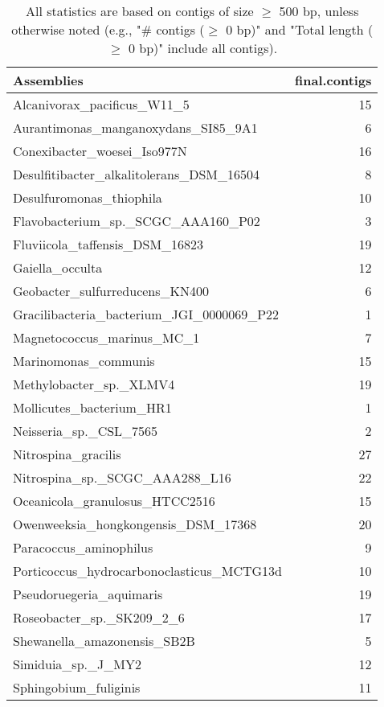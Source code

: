 \documentclass[12pt,a4paper]{article}
\begin{document}
\begin{table}[ht]
\begin{center}
\caption{All statistics are based on contigs of size $\geq$ 500 bp, unless otherwise noted (e.g., "\# contigs ($\geq$ 0 bp)" and "Total length ($\geq$ 0 bp)" include all contigs).}
\begin{tabular}{|l*{1}{|r}|}
\hline
Assemblies & final.contigs \\ \hline
Alcanivorax\_pacificus\_W11\_5 & 15 \\ \hline
Aurantimonas\_manganoxydans\_SI85\_9A1 & 6 \\ \hline
Conexibacter\_woesei\_Iso977N & 16 \\ \hline
Desulfitibacter\_alkalitolerans\_DSM\_16504 & 8 \\ \hline
Desulfuromonas\_thiophila & 10 \\ \hline
Flavobacterium\_sp.\_SCGC\_AAA160\_P02 & 3 \\ \hline
Fluviicola\_taffensis\_DSM\_16823 & 19 \\ \hline
Gaiella\_occulta & 12 \\ \hline
Geobacter\_sulfurreducens\_KN400 & 6 \\ \hline
Gracilibacteria\_bacterium\_JGI\_0000069\_P22 & 1 \\ \hline
Magnetococcus\_marinus\_MC\_1 & 7 \\ \hline
Marinomonas\_communis & 15 \\ \hline
Methylobacter\_sp.\_XLMV4 & 19 \\ \hline
Mollicutes\_bacterium\_HR1 & 1 \\ \hline
Neisseria\_sp.\_CSL\_7565 & 2 \\ \hline
Nitrospina\_gracilis & 27 \\ \hline
Nitrospina\_sp.\_SCGC\_AAA288\_L16 & 22 \\ \hline
Oceanicola\_granulosus\_HTCC2516 & 15 \\ \hline
Owenweeksia\_hongkongensis\_DSM\_17368 & 20 \\ \hline
Paracoccus\_aminophilus & 9 \\ \hline
Porticoccus\_hydrocarbonoclasticus\_MCTG13d & 10 \\ \hline
Pseudoruegeria\_aquimaris & 19 \\ \hline
Roseobacter\_sp.\_SK209\_2\_6 & 17 \\ \hline
Shewanella\_amazonensis\_SB2B & 5 \\ \hline
Simiduia\_sp.\_J\_MY2 & 12 \\ \hline
Sphingobium\_fuliginis & 11 \\ \hline

\end{tabular}
\end{center}
\end{table}
\end{document}
